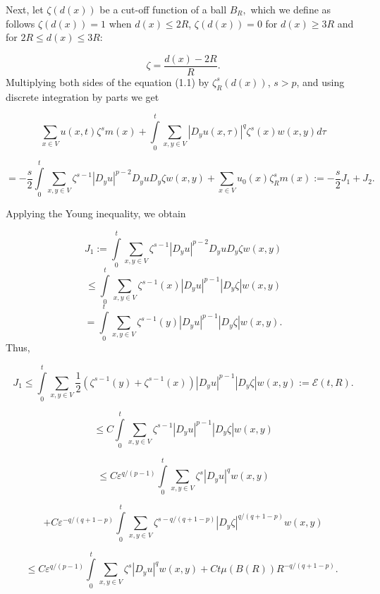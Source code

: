 \documentclass{article}
\begin{document}
	\bigskip Next, let $\zeta (d(x))$ be a cut-off function of a ball $B_{R},$
	which we define as follows $\zeta (d(x))=1$ when $d(x)\leq 2R$, $\zeta
	(d(x))=0$ for $d(x)\geq 3R$ and for $2R\leq d(x)\leq 3R$:
	
	\[
	\zeta =\frac{d(x)-2R}{R}\text{.}
	\]
	Multiplying both sides of the equation (1.1) by $\zeta _{R}^{s}(d(x))$, $
	s>p$, and using discrete integration by parts we get
	
	\[
	\sum\limits_{x\in V}u(x,t)\zeta
	^{s}m(x)+\int\limits_{0}^{t}\sum\limits_{x,y\in V}\left\vert D_{y}u(x,\tau
	)\right\vert ^{q}\zeta ^{s}(x)w(x,y)d\tau
	\]
	
	\begin{equation}
		=-\frac{s}{2}\int\limits_{0}^{t}\sum\limits_{x,y\in V}\zeta
		^{s-1}\left\vert D_{y}u\right\vert ^{p-2}D_{y}uD_{y}\zeta
		w(x,y)+\sum\limits_{x\in V}u_{0}(x)\zeta _{R}^{s}m(x):=-\frac{s}{2}
		J_{1}+J_{2}\text{.}  \tag{2.3}
	\end{equation}
	
	\bigskip Applying the Young inequality, we obtain
	
	\[
	J_{1}:=\int\limits_{0}^{t}\sum\limits_{x,y\in V}\zeta ^{s-1}\left\vert
	D_{y}u\right\vert ^{p-2}D_{y}uD_{y}\zeta w(x,y)
	\]
	\[
	\leq \int\limits_{0}^{t}\sum\limits_{x,y\in V}\zeta ^{s-1}(x)\left\vert
	D_{y}u\right\vert ^{p-1}\left\vert D_{y}\zeta \right\vert w(x,y)
	\]
	\[
	=\int\limits_{0}^{t}\sum\limits_{x,y\in V}\zeta ^{s-1}(y)\left\vert
	D_{y}u\right\vert ^{p-1}\left\vert D_{y}\zeta \right\vert w(x,y).
	\]
	Thus,
	
	\[
	J_{1}\leq \int\limits_{0}^{t}\sum\limits_{x,y\in V}\frac{1}{2}\left( \zeta
	^{s-1}(y)+\zeta ^{s-1}(x)\right) \left\vert D_{y}u\right\vert
	^{p-1}\left\vert D_{y}\zeta \right\vert w(x,y):=\mathcal{E}(t,R)\text{.}
	\]
	
	\[
	\leq C\int\limits_{0}^{t}\sum\limits_{x,y\in V}\zeta ^{s-1}\left\vert
	D_{y}u\right\vert ^{p-1}\left\vert D_{y}\zeta \right\vert w(x,y)
	\]
	
	\[
	\leq C\varepsilon ^{q/(p-1)}\int\limits_{0}^{t}\sum\limits_{x,y\in V}\zeta
	^{s}\left\vert D_{y}u\right\vert ^{q}w(x,y)
	\]
	
	\[
	+C\varepsilon ^{-q/(q+1-p)}\int\limits_{0}^{t}\sum\limits_{x,y\in V}\zeta
	^{s-q/(q+1-p)}\left\vert D_{y}\zeta \right\vert ^{q/(q+1-p)}w(x,y)
	\]
	
	\[
	\leq C\varepsilon ^{q/(p-1)}\int\limits_{0}^{t}\sum\limits_{x,y\in V}\zeta
	^{s}\left\vert D_{y}u\right\vert ^{q}w(x,y)+Ct\mu (B(R))R^{-q/(q+1-p)}\text{.	
	}
	\]
	
\end{document}
